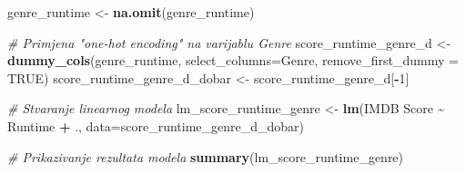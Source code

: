 \documentclass[
]{article}
\newenvironment{Shaded}{\begin{snugshade}}{\end{snugshade}}
\newcommand{\AttributeTok}[1]{\textcolor[rgb]{0.13,0.29,0.53}{#1}}
\newcommand{\CommentTok}[1]{\textcolor[rgb]{0.56,0.35,0.01}{\textit{#1}}}
\newcommand{\ConstantTok}[1]{\textcolor[rgb]{0.56,0.35,0.01}{#1}}
\newcommand{\DecValTok}[1]{\textcolor[rgb]{0.00,0.00,0.81}{#1}}
\newcommand{\FunctionTok}[1]{\textcolor[rgb]{0.13,0.29,0.53}{\textbf{#1}}}
\newcommand{\NormalTok}[1]{#1}
\newcommand{\OtherTok}[1]{\textcolor[rgb]{0.56,0.35,0.01}{#1}}
\newcommand{\SpecialCharTok}[1]{\textcolor[rgb]{0.81,0.36,0.00}{\textbf{#1}}}
\newcommand{\StringTok}[1]{\textcolor[rgb]{0.31,0.60,0.02}{#1}}
\begin{document}
\begin{Shaded}
\begin{Highlighting}[]
\NormalTok{genre\_runtime }\OtherTok{\textless{}{-}} \FunctionTok{na.omit}\NormalTok{(genre\_runtime)}




\CommentTok{\# Primjena "one{-}hot encoding" na varijablu \textquotesingle{}Genre\textquotesingle{}}
\NormalTok{score\_runtime\_genre\_d }\OtherTok{\textless{}{-}} \FunctionTok{dummy\_cols}\NormalTok{(genre\_runtime, }\AttributeTok{select\_columns=}\StringTok{\textquotesingle{}Genre\textquotesingle{}}\NormalTok{, }\AttributeTok{remove\_first\_dummy =} \ConstantTok{TRUE}\NormalTok{)}
\NormalTok{score\_runtime\_genre\_d\_dobar }\OtherTok{\textless{}{-}}\NormalTok{ score\_runtime\_genre\_d[}\SpecialCharTok{{-}}\DecValTok{1}\NormalTok{]}

\CommentTok{\# Stvaranje linearnog modela}
\NormalTok{lm\_score\_runtime\_genre }\OtherTok{\textless{}{-}} \FunctionTok{lm}\NormalTok{(}\StringTok{\textasciigrave{}}\AttributeTok{IMDB Score}\StringTok{\textasciigrave{}} \SpecialCharTok{\textasciitilde{}}\NormalTok{ Runtime }\SpecialCharTok{+}\NormalTok{ ., }\AttributeTok{data=}\NormalTok{score\_runtime\_genre\_d\_dobar)}

\CommentTok{\# Prikazivanje rezultata modela}
\FunctionTok{summary}\NormalTok{(lm\_score\_runtime\_genre)}
\end{Highlighting}
\end{Shaded}
\end{document}
